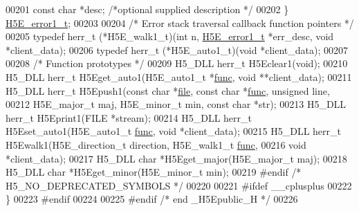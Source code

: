 \begin{DoxyCode}
00201     \textcolor{keyword}{const} \textcolor{keywordtype}{char}  *desc;                  \textcolor{comment}{/*optional supplied description      */}
00202 \} \hyperlink{struct_h5_e__error1__t}{H5E\_error1\_t};
00203 
00204 \textcolor{comment}{/* Error stack traversal callback function pointers */}
00205 \textcolor{keyword}{typedef} herr\_t (*H5E\_walk1\_t)(\textcolor{keywordtype}{int} n, \hyperlink{struct_h5_e__error1__t}{H5E\_error1\_t} *err\_desc, \textcolor{keywordtype}{void} *client\_data);
00206 \textcolor{keyword}{typedef} herr\_t (*H5E\_auto1\_t)(\textcolor{keywordtype}{void} *client\_data);
00207 
00208 \textcolor{comment}{/* Function prototypes */}
00209 H5\_DLL herr\_t H5Eclear1(\textcolor{keywordtype}{void});
00210 H5\_DLL herr\_t H5Eget\_auto1(H5E\_auto1\_t *\hyperlink{structfunc}{func}, \textcolor{keywordtype}{void} **client\_data);
00211 H5\_DLL herr\_t H5Epush1(\textcolor{keyword}{const} \textcolor{keywordtype}{char} *\hyperlink{structfile}{file}, \textcolor{keyword}{const} \textcolor{keywordtype}{char} *\hyperlink{structfunc}{func}, \textcolor{keywordtype}{unsigned} line,
00212     H5E\_major\_t maj, H5E\_minor\_t min, \textcolor{keyword}{const} \textcolor{keywordtype}{char} *str);
00213 H5\_DLL herr\_t H5Eprint1(FILE *stream);
00214 H5\_DLL herr\_t H5Eset\_auto1(H5E\_auto1\_t \hyperlink{structfunc}{func}, \textcolor{keywordtype}{void} *client\_data);
00215 H5\_DLL herr\_t H5Ewalk1(H5E\_direction\_t direction, H5E\_walk1\_t \hyperlink{structfunc}{func},
00216     \textcolor{keywordtype}{void} *client\_data);
00217 H5\_DLL \textcolor{keywordtype}{char} *H5Eget\_major(H5E\_major\_t maj);
00218 H5\_DLL \textcolor{keywordtype}{char} *H5Eget\_minor(H5E\_minor\_t min);
00219 \textcolor{preprocessor}{#endif }\textcolor{comment}{/* H5\_NO\_DEPRECATED\_SYMBOLS */}\textcolor{preprocessor}{}
00220 
00221 \textcolor{preprocessor}{#ifdef \_\_cplusplus}
00222 \}
00223 \textcolor{preprocessor}{#endif}
00224 
00225 \textcolor{preprocessor}{#endif }\textcolor{comment}{/* end \_H5Epublic\_H */}\textcolor{preprocessor}{}
00226 
\end{DoxyCode}
